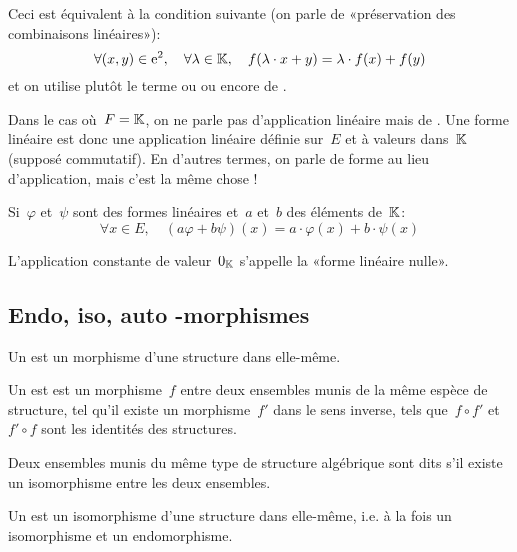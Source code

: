 Ceci est équivalent à la condition suivante (on parle de «préservation des combinaisons
linéaires»):
\begin{equation}\colorred
\forall (x,y)\in \mathrm{e}^2,\quad \forall \lambda\in\KK,\quad f(\lambda\cdot x+ y)=\lambda \cdot f(x) + f(y)
\end{equation}
et on utilise plutôt le terme  ou  ou encore de .

\medskip
Dans le cas où~$F=\mathbb K$, on ne parle pas d'application linéaire mais de .
Une forme linéaire est donc une application linéaire définie sur~$E$ et à valeurs dans~$\mathbb K$ (supposé commutatif).
En d'autres termes, on parle de forme au lieu d'application, mais c'est la même chose !

\medskip
Si~$\varphi$ et~$\psi$ sont des formes linéaires et~$a$ et~$b$ des éléments de~$\mathbb K$:
\begin{equation}
  \forall x \in E,\quad (a\varphi + b\psi)(x) = a\cdot \varphi(x) + b\cdot \psi(x)
\end{equation}

\medskip
L'application constante de valeur~$0_{\mathbb K}$ s'appelle la «forme linéaire nulle».

\medskip
\subsection{Endo, iso, auto -morphismes}

Un  est un morphisme d'une structure dans elle-même.

\medskip
Un  est est un morphisme~$f$ entre deux ensembles munis de la même espèce de structure, tel qu'il existe un morphisme~$f'$ dans le sens inverse, tels que~$f\circ f'$ et~$f'\circ f$ sont les identités des structures.

Deux ensembles munis du même type de structure algébrique sont dits  s'il existe un isomorphisme entre les deux ensembles.


\medskip
Un  est un isomorphisme d'une structure dans elle-même, i.e. à la fois un isomorphisme et un endomorphisme.

